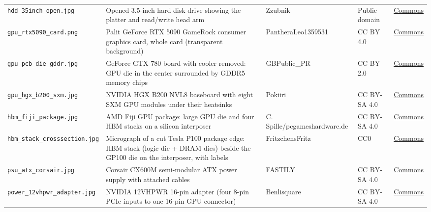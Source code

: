 {\begin{longtable}{@{}>{\raggedright\arraybackslash}p{36mm}>{\raggedright\arraybackslash}p{56mm}>{\raggedright\arraybackslash}p{26mm}>{\raggedright\arraybackslash}p{15mm}l@{}}
\texttt{hdd\_\allowbreak{}35inch\_\allowbreak{}open.jpg} &Opened 3.5-inch hard disk drive showing the platter and read/write head arm & Zzubnik & Public domain & \href{https://commons.wikimedia.org/wiki/File:Open_hard-drive.jpg}{Commons} \\
\texttt{gpu\_\allowbreak{}rtx5090\_\allowbreak{}card.png} &Palit GeForce RTX 5090 GameRock consumer graphics card, whole card (transparent background) & PantheraLeo1359531 & CC BY 4.0 & \href{https://commons.wikimedia.org/wiki/File:Palit_GeForce_RTX_5090_Gamerock_20250530_HOF4166_RAW-Export.png}{Commons} \\
\texttt{gpu\_\allowbreak{}pcb\_\allowbreak{}die\_\allowbreak{}gddr.jpg} &GeForce GTX 780 board with cooler removed: GPU die in the center surrounded by GDDR5 memory chips & GBPublic\_PR & CC BY 2.0 & \href{https://commons.wikimedia.org/wiki/File:NVIDIA_GeForce_GTX_780_PCB-Front.jpg}{Commons} \\
\texttt{gpu\_\allowbreak{}hgx\_\allowbreak{}b200\_\allowbreak{}sxm.jpg} &NVIDIA HGX B200 NVL8 baseboard with eight SXM GPU modules under their heatsinks & Pokiiri & CC BY-SA 4.0 & \href{https://commons.wikimedia.org/wiki/File:Nvidia_DGX-B200-HGX.jpg}{Commons} \\
\texttt{hbm\_\allowbreak{}fiji\_\allowbreak{}package.jpg} &AMD Fiji GPU package: large GPU die and four HBM stacks on a silicon interposer & C. Spille/pcgameshardware.de & CC BY-SA 4.0 & \href{https://commons.wikimedia.org/wiki/File:AMD_Fiji_GPU_package_with_GPU,_HBM_memory_and_interposer.jpg}{Commons} \\
\texttt{hbm\_\allowbreak{}stack\_\allowbreak{}crosssection.jpg} &Micrograph of a cut Tesla P100 package edge: HBM stack (logic die + DRAM dies) beside the GP100 die on the interposer, with labels & FritzchensFritz & CC0 & \href{https://commons.wikimedia.org/wiki/File:Nvidia@16nm@Pascal@GP100@Tesla_P100@T_Taiwan_1912A1_PN9G70.S6W_GP100-897-A1_DSCx11_HBM-Stack_notes.jpg}{Commons} \\
\texttt{psu\_\allowbreak{}atx\_\allowbreak{}corsair.jpg} &Corsair CX600M semi-modular ATX power supply with attached cables & FASTILY & CC BY-SA 4.0 & \href{https://commons.wikimedia.org/wiki/File:Corsair_CX600M_3_2019-05-06.jpg}{Commons} \\
\texttt{power\_\allowbreak{}12vhpwr\_\allowbreak{}adapter.jpg} &NVIDIA 12VHPWR 16-pin adapter (four 8-pin PCIe inputs to one 16-pin GPU connector) & Benlisquare & CC BY-SA 4.0 & \href{https://commons.wikimedia.org/wiki/File:Nvidia_12VHPWR_adapter.jpg}{Commons} \\

\end{longtable}}
